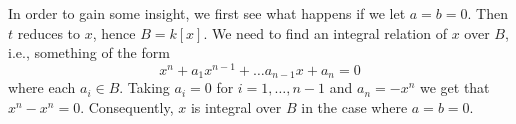 \documentclass{article}
\begin{document}
In order to gain some insight, we first see what happens if we let $a = b
= 0$.  Then $t$ reduces to $x$, hence $B = k[x]$. We need to find an
integral relation of $x$ over $B$, i.e., something of the form
\begin{equation} \label{eq:int_dep} x^n + a_1x^{n-1} + \ldots a_{n-1}x +
a_n = 0 \end{equation} where each $a_i \in B$. Taking $a_i = 0$ for $i =
1, \ldots, n-1$ and $a_n = -x^n$ we get that $x^n - x^n = 0$.
Consequently, $x$ is integral over $B$ in the case where $a = b = 0$.
\end{document}
